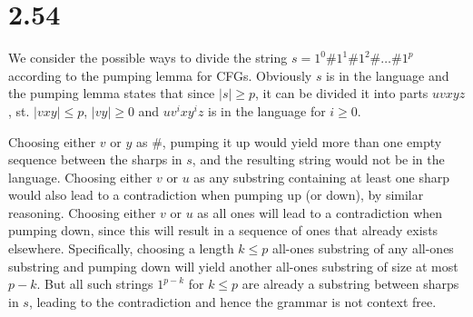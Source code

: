 \documentclass[12pt]{article}
\begin{document}
\section*{2.54}
We consider the possible ways to divide the string $s=1^0\#1^1\#1^2\# \hdots \#1^p$ according to the pumping lemma for CFGs. Obviously $s$ is in the language and the pumping lemma states that since $\left| s \right| \geq p$, it can be divided it into parts $uvxyz$, st. $\left| vxy \right| \leq p$, $\left| vy \right| \geq 0$ and $uv^ixy^iz$ is in the language for $i \geq 0$.

Choosing either $v$ or $y$ as $\#$, pumping it up would yield more than one empty sequence between the sharps in $s$, and the resulting string would not be in the language. Choosing either $v$ or $u$ as any substring containing at least one sharp would also lead to a contradiction when pumping up (or down), by similar reasoning. Choosing either $v$ or $u$ as all ones will lead to a contradiction when pumping down, since this will result in a sequence of ones that already exists elsewhere. Specifically, choosing a length $k \leq p$ all-ones substring of any all-ones substring and pumping down will yield another all-ones substring of size at most $p-k$. But all such strings $1^{p-k}$ for $k \leq p$ are already a substring between sharps in $s$, leading to the contradiction and hence the grammar is not context free.



\end{document}
